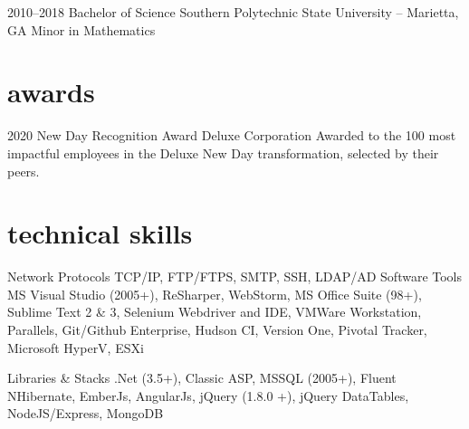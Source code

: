 \documentclass[]{friggeri-cv} %
\begin{document}
\begin{entrylist}


\entry
{2010--2018}
{Bachelor {\normalfont of Science}}
{Southern Polytechnic State University -- Marietta, GA }
{Minor in Mathematics}


\end{entrylist}

\section{awards}

\begin{entrylist}


\entry
{2020}
{New Day Recognition Award}
{Deluxe Corporation}
{Awarded to the 100 most impactful employees in the Deluxe New Day transformation, selected by their peers.}


\end{entrylist}


\section{technical skills}

\begin{entrylist}
\entry
{}
{Network Protocols}
{}
{TCP/IP, FTP/FTPS, SMTP, SSH, LDAP/AD}
\entry
{}
{Software Tools}
{}
{MS Visual Studio (2005+), ReSharper, WebStorm, MS Office Suite (98+), Sublime Text 2 \& 3, Selenium Webdriver and IDE, VMWare Workstation, Parallels, Git/Github Enterprise, Hudson CI, Version One, Pivotal Tracker, Microsoft HyperV, ESXi}

\entry
{}
{Libraries \& Stacks}
{}
{.Net (3.5+), Classic ASP, MSSQL (2005+), Fluent NHibernate,
EmberJs, AngularJs, jQuery (1.8.0 +), jQuery DataTables, NodeJS/Express, MongoDB}
\end{entrylist}
\end{document}
